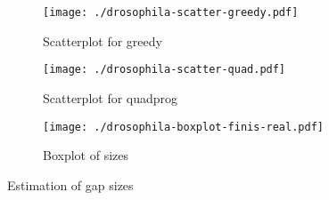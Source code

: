 \documentclass[12pt]{amsart}
\begin{document}
\begin{figure}[h!]
  \centering

    \begin{subfigure}{230pt}
    \centering
      \texttt{[image: ./drosophila-scatter-greedy.pdf]}
      \caption{Scatterplot for greedy}
    \end{subfigure}%
    \begin{subfigure}{230pt}
      \texttt{[image: ./drosophila-scatter-quad.pdf]}
      \caption{Scatterplot for quadprog}
    \end{subfigure}

    \begin{subfigure}{400pt}
      \texttt{[image: ./drosophila-boxplot-finis-real.pdf]}
      \caption{Boxplot of sizes}
    \end{subfigure}

  \caption{Estimation of gap sizes}
\end{figure}
\end{document}
